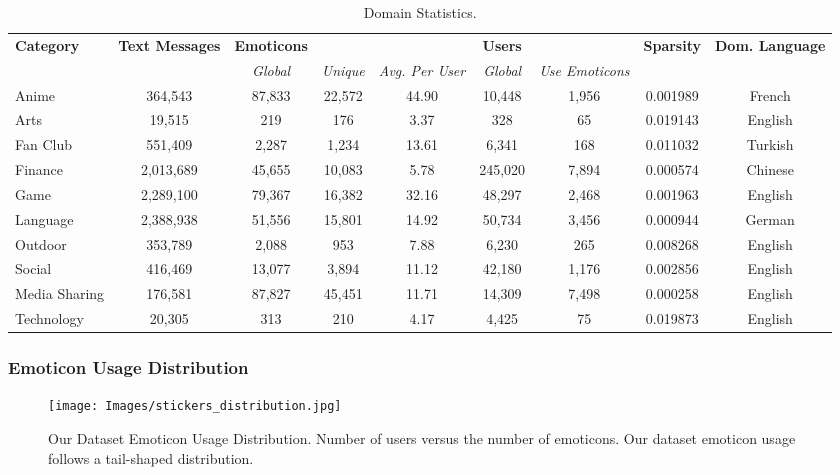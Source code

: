 \begin{table*}[h]
    \centering
    \caption{Domain Statistics.}
    \begin{tabular}{@{}lcccccccc@{}} 
    \toprule
    \textbf{Category} & \textbf{Text Messages} & \textbf{Emoticons}& & & \textbf{Users}&& \textbf{Sparsity} & \textbf{Dom. Language} \\
    &  & \textit{Global}& \textit{Unique} & \textit{Avg. Per User}& \textit{Global} & \textit{Use Emoticons} & & \\ \midrule

    Anime & 364,543 & 87,833 & 22,572 & 44.90 & 10,448 & 1,956 & 0.001989 & French \\
    Arts & 19,515 & 219 & 176 & 3.37 & 328 & 65 & 0.019143 & English\\
    Fan Club & 551,409 & 2,287 & 1,234 & 13.61 & 6,341 & 168 & 0.011032 &  Turkish\\
    Finance & 2,013,689 & 45,655 & 10,083 & 5.78 & 245,020 & 7,894 & 0.000574 &  Chinese\\
    Game & 2,289,100 & 79,367 & 16,382 & 32.16 & 48,297 & 2,468 & 0.001963 &  English \\
    Language & 2,388,938 & 51,556 & 15,801 & 14.92 & 50,734 & 3,456 & 0.000944 & German \\
    Outdoor & 353,789 & 2,088 & 953 & 7.88 & 6,230 & 265 & 0.008268 & English \\
    Social & 416,469 & 13,077 & 3,894 & 11.12 & 42,180 & 1,176 & 0.002856 & English \\
    Media Sharing & 176,581 & 87,827 & 45,451 &  11.71 & 14,309 & 7,498 & 0.000258 & English \\
    Technology & 20,305 & 313 & 210 & 4.17 & 4,425 & 75 & 0.019873 & English \\
    \bottomrule     
    \end{tabular}
    \label{tab:category-language-sparsity}
\end{table*}

\subsubsection{Emoticon Usage Distribution}
\begin{figure}[htbp] 
    \centering \texttt{[image: Images/stickers\_distribution.jpg]} 
    \caption{Our Dataset Emoticon Usage Distribution. Number of users versus the number of emoticons. Our dataset emoticon usage follows a tail-shaped distribution.} 
\label{fig:emoticons-user-distribution} 
\end{figure}


